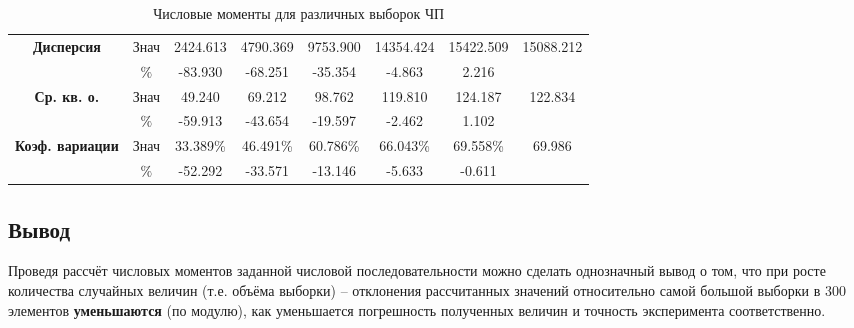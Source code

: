 \begin{table}[h]
{\begin{tabular}{|c|c|c|c|c|c|c|c|}
			\hline
			\multirow{2}{*}{\textbf{Дисперсия}}        & Знач & 2424.613                                                   & 4790.369    & 9753.900    & 14354.424    & 15422.509    & \multirow{2}{*}{15088.212} \\
			\cline{2-7}
			                                           & $\%$ & -83.930                                                    & -68.251     & -35.354     & -4.863       & 2.216        &                            \\
			\hline
			\multirow{2}{*}{\textbf{Ср. кв. о.}}       & Знач & 49.240                                                     & 69.212      & 98.762      & 119.810      & 124.187      & \multirow{2}{*}{122.834}   \\
			\cline{2-7}
			                                           & $\%$ & -59.913                                                    & -43.654     & -19.597     & -2.462       & 1.102        &                            \\
			\hline
			\multirow{2}{*}{\textbf{Коэф. вариации}}   & Знач & 33.389\%                                                   & 46.491\%    & 60.786\%    & 66.043\%     & 69.558\%     & \multirow{2}{*}{69.986}    \\
			\cline{2-7}
			                                           & $\%$ & -52.292                                                    & -33.571     & -13.146     & -5.633       & -0.611       &                            \\
			\hline
		\end{tabular}}
	\caption{Числовые моменты для различных выборок ЧП}
\end{table}

\subsection{Вывод}
Проведя рассчёт числовых моментов заданной числовой последовательности можно сделать однозначный вывод о том, что при росте количества случайных величин (т.е. объёма выборки) -- отклонения рассчитанных значений относительно самой большой выборки в 300 элементов \textbf{уменьшаются} (по модулю), как уменьшается погрешность полученных величин и точность эксперимента соответственно.
